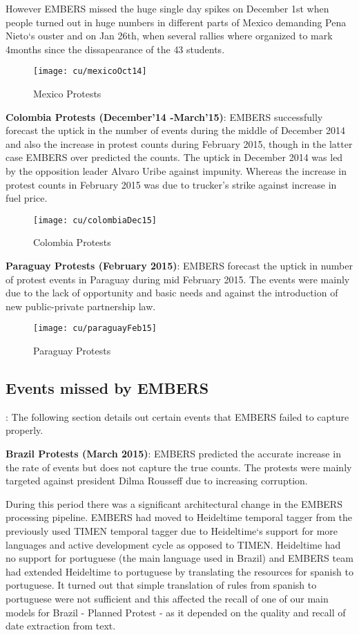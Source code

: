However EMBERS missed the huge single day spikes on December 1st when
people turned out in huge numbers in different parts of Mexico demanding
Pena Nieto`s ouster and on Jan 26th, when several rallies where
organized to mark 4months since the dissapearance of the 43 students.
\begin{figure}[H]
\texttt{[image: cu/mexicoOct14]}
\caption{Mexico Protests}
\label{fig:mexicoOct14}
\end{figure}

\textbf{Colombia Protests (December'14 -March'15)}:
EMBERS successfully forecast the uptick in the number of events during the
middle of December 2014 and also the increase in protest counts during February
2015, though in the latter case EMBERS over predicted the counts. The uptick in
December 2014 was led by the opposition leader Alvaro Uribe against impunity.
Whereas the increase in  protest counts in February 2015
was due to trucker’s strike against increase in fuel price.

\begin{figure}[H]
\texttt{[image: cu/colombiaDec15]}
\caption{Colombia Protests}
\label{fig:colombiaDec14}
\end{figure}

\textbf{Paraguay Protests (February 2015)}:
EMBERS forecast the uptick in number of protest events in Paraguay during mid
February 2015. The events were mainly due to the lack of opportunity and basic
needs and against the introduction of new public-private partnership law.

\begin{figure}[H]
\texttt{[image: cu/paraguayFeb15]}
\caption{Paraguay Protests}
\label{fig:paraguay15}
\end{figure}


\subsection{Events missed by EMBERS}:
The following section details out certain events that EMBERS failed to
capture properly.

\textbf{Brazil Protests (March 2015)}: EMBERS predicted the accurate
increase in the rate of events but does not capture the true counts. The
protests were mainly targeted against president Dilma Rousseff due to
increasing corruption. 

During this period there was a significant architectural change in the
EMBERS processing pipeline. EMBERS had moved to Heideltime temporal
tagger from the previously used TIMEN temporal tagger due to
Heideltime`s support for more languages and active development cycle as
opposed to TIMEN. Heideltime had no support for portuguese (the main
language used in Brazil) and EMBERS team had extended Heideltime to
portuguese by translating the resources for spanish to portuguese. It
turned out that simple translation of rules from spanish to portuguese
were not sufficient and this affected the recall of one of our main
models for Brazil - Planned Protest - as it depended on the quality and recall of
date extraction from text.


